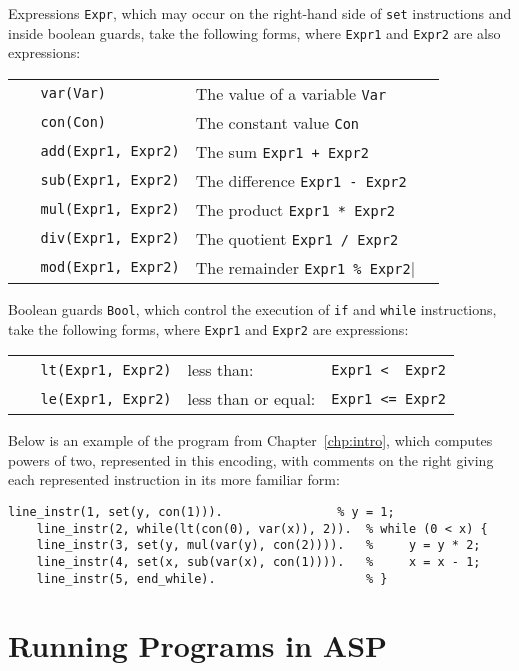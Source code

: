 \documentclass[a4paper,twoside,notitlepage]{report}
\begin{document}
Expressions \verb|Expr|, which may occur on the right-hand side of 
\verb|set| instructions and inside boolean guards, take the following 
forms, where \verb|Expr1| and \verb|Expr2| are also expressions:

\begin{tabular}{lll}
    \verb|   var(Var)|          & The value of a variable \verb|Var|
\\  \verb|   con(Con)|          & The constant value \verb|Con|
\\  \verb|   add(Expr1, Expr2)| & The sum \verb|Expr1 + Expr2|
\\  \verb|   sub(Expr1, Expr2)| & The difference \verb|Expr1 - Expr2|
\\  \verb|   mul(Expr1, Expr2)| & The product \verb|Expr1 * Expr2|
\\  \verb|   div(Expr1, Expr2)| & The quotient \verb|Expr1 / Expr2|
\\  \verb|   mod(Expr1, Expr2)| & The remainder \verb|Expr1 % Expr2|
\end{tabular}

Boolean guards \verb|Bool|, which control the execution of \verb|if| and 
\verb|while| instructions, take the following forms, where \verb|Expr1| 
and \verb|Expr2| are expressions:

\begin{tabular}{lll}
    \verb|   lt(Expr1, Expr2)| & less than:          & \verb|Expr1 <  Expr2|
\\  \verb|   le(Expr1, Expr2)| & less than or equal: & \verb|Expr1 <= Expr2|
\end{tabular}

Below is an example of the program from Chapter~\ref{chp:intro}, which 
computes powers of two, represented in this encoding, with comments on 
the right giving each represented instruction in its more familiar form:
\begin{Verbatim}[samepage=true]
    line_instr(1, set(y, con(1))).                % y = 1;
    line_instr(2, while(lt(con(0), var(x)), 2)).  % while (0 < x) {
    line_instr(3, set(y, mul(var(y), con(2)))).   %     y = y * 2;
    line_instr(4, set(x, sub(var(x), con(1)))).   %     x = x - 1;
    line_instr(5, end_while).                     % }
\end{Verbatim}

\section{Running Programs in ASP} \label{sec:runasp}
\end{document}
